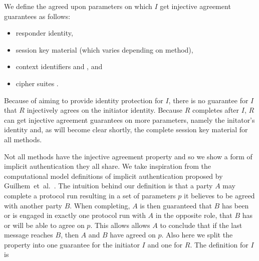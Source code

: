We define the agreed upon parameters on which $I$ get injective agreement
guarantees as follows:
\begin{itemize}
    \item responder identity,
    \item session key material (which varies depending on \mEdhoc{} method),
    \item context identifiers \mCi{} and \mCr{}, and
    \item cipher suites \mSuites{}.
\end{itemize}
%
Because of \mEdhoc{} aiming to provide identity protection for $I$, there is no
guarantee for $I$ that $R$ injectively agrees on the initiator identity.
%
Because $R$ completes after $I$, $R$ can get injective agreement guarantees on
more parameters, namely the initator's identity and, as will become clear
shortly, the complete session key material for all methods.
%

%
%

Not all \mEdhoc{} methods have the injective agreement property and so we show
a form of implicit authentication they all share.
%
We take inspiration from the computational model definitions of implicit
authentication proposed by Guilhem~et~al.~\cite{DBLP:conf/csfw/GuilhemFW20}.
%
The intuition behind our definition is that a party $A$ may complete a protocol
run resulting in a set of parameters $p$ it believes to be agreed with another
party $B$.
%
When completing, $A$ is then guaranteed that $B$ has been or is
engaged in exactly one protocol run with $A$ in the opposite role, that $B$
has or will be able to agree on $p$.
%
This allows allows $A$ to conclude that if the last message reaches $B$, then
$A$ and $B$ have agreed on $p$.
%
Also here we split the property into one guarantee for the initiator $I$ and
one for $R$.
%
The definition for $I$ is


